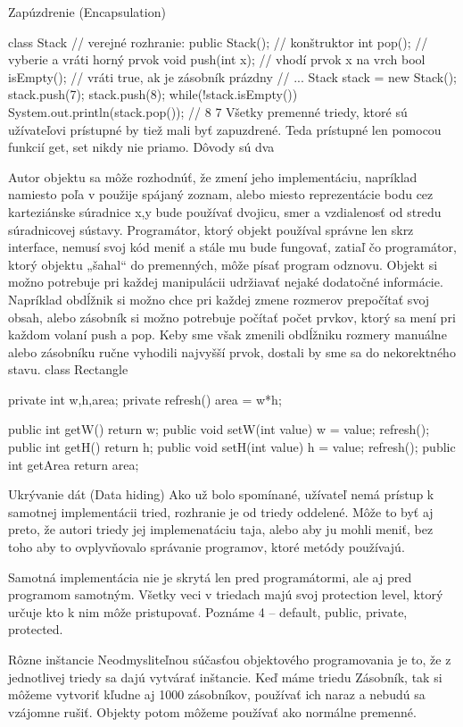 Zapúzdrenie (Encapsulation)

class Stack {
    // verejné rozhranie:
    public Stack(); // konštruktor
    int pop(); // vyberie a vráti horný prvok
    void push(int x); // vhodí prvok x na vrch
    bool isEmpty(); // vráti true, ak je zásobník prázdny
}
// ...
{
    Stack stack = new Stack();
    stack.push(7);
    stack.push(8);
    while(!stack.isEmpty()) System.out.println(stack.pop());
    // 8 7    
}
Všetky premenné triedy, ktoré sú užívateľovi prístupné by tiež mali byť zapuzdrené. Teda prístupné len pomocou funkcií get, set nikdy nie priamo. Dôvody sú dva

Autor objektu sa môže rozhodnúť, že zmení jeho implementáciu, napríklad namiesto poľa v použije spájaný zoznam, alebo miesto reprezentácie bodu cez karteziánske súradnice x,y bude používať dvojicu, smer a vzdialenosť od stredu súradnicovej sústavy. Programátor, ktorý objekt používal správne len skrz interface, nemusí svoj kód meniť a stále mu bude fungovať, zatiaľ čo programátor, ktorý objektu „šahal“ do premenných, môže písať program odznovu.
Objekt si možno potrebuje pri každej manipulácii udržiavať nejaké dodatočné informácie. Napríklad obdĺžnik si možno chce pri každej zmene rozmerov prepočítať svoj obsah, alebo zásobník si možno potrebuje počítať počet prvkov, ktorý sa mení pri každom volaní push a pop. Keby sme však zmenili obdĺžniku rozmery manuálne alebo zásobníku ručne vyhodili najvyšší prvok, dostali by sme sa do nekorektného stavu.
class Rectangle {
    private int w,h,area;
    private refresh(){ 
        area = w*h;
    }
 
    public int getW(){ return w; }
    public void setW(int value) {
        w = value;
        refresh();
    }
    public int getH(){ return h; }
    public void setH(int value) {
        h = value;
        refresh();
    }
    public int getArea{ return area; }
 
}
Ukrývanie dát (Data hiding)
Ako už bolo spomínané, užívateľ nemá prístup k samotnej implementácii tried, rozhranie je od triedy oddelené. Môže to byť aj preto, že autori triedy jej implemenatáciu taja, alebo aby ju mohli meniť, bez toho aby to ovplyvňovalo správanie programov, ktoré metódy používajú.

Samotná implementácia nie je skrytá len pred programátormi, ale aj pred programom samotným. Všetky veci v triedach majú svoj protection level, ktorý určuje kto k nim môže pristupovať. Poznáme 4 – default, public, private, protected.

Rôzne inštancie
Neodmysliteľnou súčasťou objektového programovania je to, že z jednotlivej triedy sa dajú vytvárať inštancie. Keď máme triedu Zásobník, tak si môžeme vytvoriť kľudne aj 1000 zásobníkov, používať ich naraz a nebudú sa vzájomne rušiť. Objekty potom môžeme používať ako normálne premenné.

